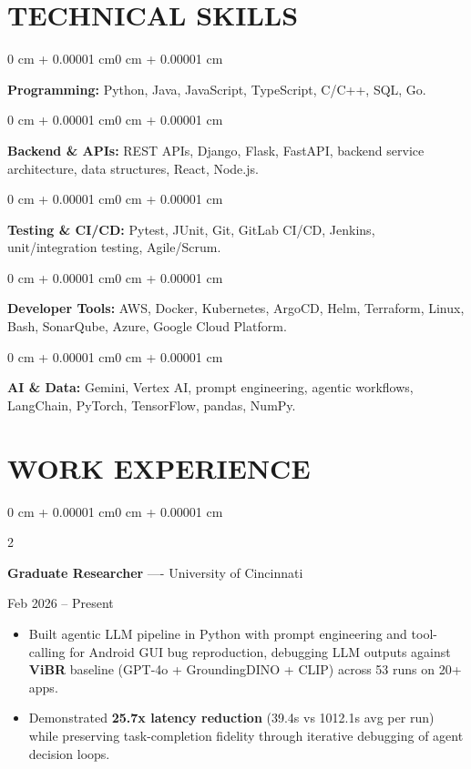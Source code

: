 \documentclass[10pt, letterpaper]{article}
\newenvironment{highlights}{
    \begin{itemize}[
        topsep=0.10 cm,
        parsep=0.06 cm,
        partopsep=0pt,
        itemsep=0.06 cm,
        leftmargin=12pt
    ]
}{
    \end{itemize}
}
\newenvironment{onecolentry}{
    \begin{adjustwidth}{0 cm + 0.00001 cm}{0 cm + 0.00001 cm}
}{
    \end{adjustwidth}
}
\newenvironment{twocolentry}[2][]{
    \onecolentry
    \def\secondColumn{#2}
    \setcolumnwidth{\fill, 4.5 cm}
    \begin{paracol}{2}
}{
    \switchcolumn \raggedleft \secondColumn
    \end{paracol}
    \endonecolentry
}
\begin{document}
\section{TECHNICAL SKILLS}
\begin{onecolentry}
\textbf{Programming:} Python, Java, JavaScript, TypeScript, C/C++, SQL, Go.
\end{onecolentry}
\vspace{0.06 cm}
\begin{onecolentry}
\textbf{Backend \& APIs:} REST APIs, Django, Flask, FastAPI, backend service architecture, data structures, React, Node.js.
\end{onecolentry}
\vspace{0.06 cm}
\begin{onecolentry}
\textbf{Testing \& CI/CD:} Pytest, JUnit, Git, GitLab CI/CD, Jenkins, unit/integration testing, Agile/Scrum.
\end{onecolentry}
\vspace{0.06 cm}
\begin{onecolentry}
\textbf{Developer Tools:} AWS, Docker, Kubernetes, ArgoCD, Helm, Terraform, Linux, Bash, SonarQube, Azure, Google Cloud Platform.
\end{onecolentry}
\vspace{0.06 cm}
\begin{onecolentry}
\textbf{AI \& Data:} Gemini, Vertex AI, prompt engineering, agentic workflows, LangChain, PyTorch, TensorFlow, pandas, NumPy.
\end{onecolentry}

\section{WORK EXPERIENCE}
\begin{twocolentry}{Feb 2026 -- Present}
\textbf{Graduate Researcher} ---- University of Cincinnati
\end{twocolentry}
\begin{highlights}
  \item Built agentic LLM pipeline in Python with prompt engineering and tool-calling for Android GUI bug reproduction, debugging LLM outputs against \textbf{ViBR} baseline (GPT-4o + GroundingDINO + CLIP) across 53 runs on 20+ apps.
  \item Demonstrated \textbf{25.7x latency reduction} (39.4s vs 1012.1s avg per run) while preserving task-completion fidelity through iterative debugging of agent decision loops.
\end{highlights}
\end{document}
